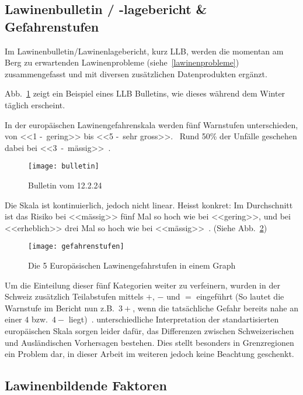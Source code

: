 \subsection{Lawinenbulletin / -lagebericht \& Gefahrenstufen}

Im Lawinenbulletin/Lawinenlagebericht, kurz LLB, werden die momentan am Berg zu erwartenden Lawinenprobleme (siehe~\ref{lawinenprobleme}) zusammengefasst und mit diversen zusätzlichen Datenprodukten ergänzt.

Abb.\ \ref{fig:bulletin} zeigt ein Beispiel eines LLB Bulletins, wie dieses während dem Winter täglich erscheint.

In der europäischen Lawinengefahrenskala werden fünf Warnstufen unterschieden, von <<1 -~gering>> bis <<5 -~sehr gross>>.~\cite{lawinengefskala} 
Rund 50\% der Unfälle geschehen dabei bei <<3~-~mässig>>~\cite{achtunglawine}.

\begin{figure}[H]
  \centering
  \texttt{[image: bulletin]}
  \caption{Bulletin vom 12.2.24~\cite{slfarchiv}}\label{fig:bulletin}
\end{figure}

Die Skala ist kontinuierlich, jedoch nicht linear. Heisst konkret: 
Im Durchschnitt ist das Risiko bei <<mässig>> fünf Mal so hoch wie bei <<gering>>, und bei <<erheblich>> drei Mal so hoch wie bei <<mässig>>~\cite{sacbergspwinter}. (Siehe Abb.\ \ref{fig:llbdanger})

\begin{figure}[H]
  \centering
  \texttt{[image: gefahrenstufen]}
  \caption{Die 5 Europäsischen Lawinengefahrstufen in einem Graph}\label{fig:llbdanger}
\end{figure}

Um die Einteilung dieser fünf Kategorien weiter zu verfeinern, wurden in der Schweiz zusätzlich Teilabstufen mittels $+$, $-$ und $=$ eingeführt (So lautet die Warnstufe im Bericht nun z.B.\ $3+$, wenn die tatsächliche Gefahr bereits nahe an einer $4$ bzw.\ $4-$ liegt)~\cite{sacbergspwinter}.
unterschiedliche Interpretation der standartisierten europäischen Skala sorgen leider dafür, das Differenzen zwischen Schweizerischen und Ausländischen Vorhersagen bestehen. Dies stellt besonders in Grenzregionen ein Problem dar, in dieser Arbeit im weiteren jedoch keine Beachtung geschenkt.


\subsection{Lawinenbildende Faktoren}

